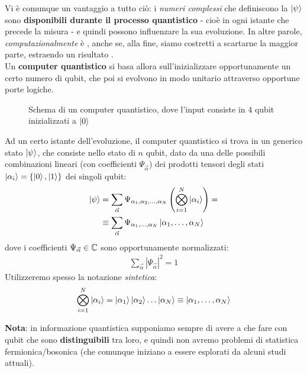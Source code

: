 \documentclass[../../InformazioneQuantistica.tex]{subfiles}
\begin{document}
Vi è comunque un vantaggio a tutto ciò: i \textit{numeri complessi} che definiscono la $\Ket{\psi}$ sono \textbf{disponibili durante il processo quantistico} - cioè in ogni istante che precede la misura - e quindi possono influenzare la sua evoluzione. In altre parole, \textit{computazionalmente} è , anche se, alla fine, siamo costretti a scartarne la maggior parte, estraendo un risultato .\\

Un \textbf{computer quantistico} si basa allora sull'inizializzare opportunamente un certo numero di qubit, che poi si evolvono in modo unitario attraverso opportune porte logiche.

\begin{figure}[H]
\centering

\caption{Schema di un computer quantistico, dove l'input consiste in $4$ qubit inizializzati a $\Ket{0}$\label{fig:computer-quantico}}
\end{figure}

Ad un certo istante dell'evoluzione, il computer quantistico si trova in un generico stato $\Ket{\psi}$, che consiste nello stato di $n$ qubit, dato da una delle possibili combinazioni lineari (con coefficienti $\Psi_{\vec{\alpha}}$) dei prodotti tensori degli stati $\Ket{\alpha_i}=\{\Ket{0},\Ket{1}\}$ dei singoli qubit:
\begin{align*}
\Ket{\psi} &=\sum_{\vec{\alpha}} \Psi_{\alpha_1,\alpha_2,\dots,\alpha_N}\left( \bigotimes_{i=1}^N \Ket{\alpha_i} \right) =\\
&\equiv\sum_{\vec{\alpha}} \Psi_{\alpha_1, \dots, \alpha_N} \Ket{\alpha_1, \dots, \alpha_N}
\end{align*}
dove i coefficienti $\Psi_{\vec{\alpha}} \in \mathbb{C}$ sono opportunamente normalizzati:
\begin{align*}
\sum_{\vec{\alpha}} \left| \Psi_{\vec{\alpha}}\right|^2 = 1
\end{align*}
Utilizzeremo spesso la notazione \textit{sintetica}:
\begin{align*}
    \bigotimes_{i=1}^N \Ket{\alpha_i} = \Ket{\alpha_1}\Ket{\alpha_2}\dots\Ket{\alpha_N} \equiv \Ket{\alpha_1, \dots, \alpha_N}
\end{align*}

\textbf{Nota}: in informazione quantistica supponiamo sempre di avere a che fare con qubit che sono \textbf{distinguibili} tra loro, e quindi non avremo problemi di statistica fermionica/bosonica (che comunque iniziano a essere esplorati da alcuni studi attuali).\\
\end{document}
